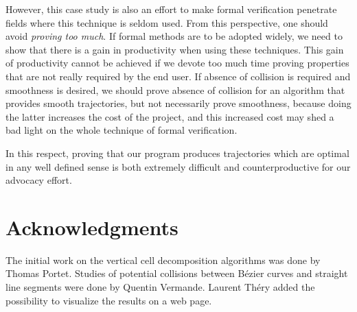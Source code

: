 \documentclass{easychair}
\begin{document}
However, this case study is also an effort to make formal verification
penetrate fields where this technique is seldom used.  From this
perspective, one should avoid {\em proving too much}.  If formal
methods are to be adopted widely, we need to show that there is a gain
in productivity when using these techniques.  This gain of
productivity cannot be achieved if we devote too much time proving
properties that are not really required by the end user.  If absence
of collision is required and smoothness is desired, we should prove
absence of collision for an algorithm that provides smooth
trajectories, but not necessarily prove smoothness, because doing the
latter increases the cost of the project, and this increased cost may
shed a bad light on the whole technique of formal verification.

In this respect, proving that our program produces trajectories which
are optimal in any well defined sense is both extremely difficult and
counterproductive for our advocacy effort.
\section*{Acknowledgments}
The initial work on the vertical cell decomposition algorithms was
done by Thomas Portet.  Studies of potential collisions between Bézier
curves and straight line segments were done by Quentin Vermande.
Laurent Théry added the possibility to visualize the results on a
web page.



\end{document}
